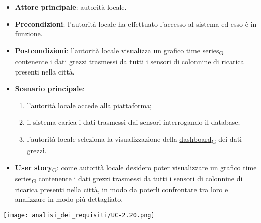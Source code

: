 \begin{itemize}
	\item \textbf{Attore principale}: autorità locale.
	\item \textbf{Precondizioni}: l'autorità locale ha effettuato l'accesso al sistema ed esso è in funzione.
	\item \textbf{Postcondizioni}: l'autorità locale visualizza un grafico \href{https://7last.github.io/docs/rtb/documentazione-interna/glossario\#time-series}{time series\textsubscript{G}} contenente i dati grezzi trasmessi da tutti i sensori
	      di colonnine di ricarica presenti nella città.
	\item \textbf{Scenario principale}:
	      \begin{enumerate}
		      \item l'autorità locale accede alla piattaforma;
		      \item il sistema carica i dati trasmessi dai sensori interrogando il database;
		      \item l'autorità locale seleziona la visualizzazione della \href{https://7last.github.io/docs/rtb/documentazione-interna/glossario\#dashboard}{dashboard\textsubscript{G}} dei dati grezzi.
	      \end{enumerate}
	\item \href{https://7last.github.io/docs/rtb/documentazione-interna/glossario\#user-story}{\textbf{User story}\textsubscript{G}}:
	      come autorità locale desidero poter visualizzare un grafico \href{https://7last.github.io/docs/rtb/documentazione-interna/glossario\#time-series}{time series\textsubscript{G}} contenente i dati grezzi trasmessi da tutti i sensori
	      di colonnine di ricarica presenti nella città, in modo da poterli confrontare tra loro e analizzare in modo più dettagliato.
\end{itemize}
\begin{center}
	\texttt{[image: analisi\_dei\_requisiti/UC-2.20.png]}
\end{center}

